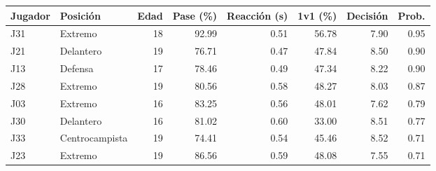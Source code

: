 \begin{tabular}{llrrrrrr}
\toprule
Jugador & Posición & Edad & Pase (\%) & Reacción (s) & 1v1 (\%) & Decisión & Prob. \\
\midrule
J31 & Extremo & 18 & 92.99 & 0.51 & 56.78 & 7.90 & 0.95 \\
J21 & Delantero & 19 & 76.71 & 0.47 & 47.84 & 8.50 & 0.90 \\
J13 & Defensa & 17 & 78.46 & 0.49 & 47.34 & 8.22 & 0.90 \\
J28 & Extremo & 19 & 80.56 & 0.58 & 48.27 & 8.03 & 0.87 \\
J03 & Extremo & 16 & 83.25 & 0.56 & 48.01 & 7.62 & 0.79 \\
J30 & Delantero & 16 & 81.02 & 0.60 & 33.00 & 8.51 & 0.77 \\
J33 & Centrocampista & 19 & 74.41 & 0.54 & 45.46 & 8.52 & 0.71 \\
J23 & Extremo & 19 & 86.56 & 0.59 & 48.08 & 7.55 & 0.71 \\
\bottomrule
\end{tabular}
